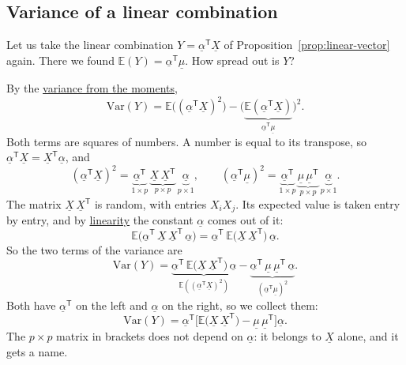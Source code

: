 \documentclass[a4paper,12pt,oneside]{report}
\begin{document}
\subsection{Variance of a linear combination}\label{sec:var-linear}

Let us take the linear combination $Y=\underline{\alpha}^{\mathsf T}\underline{X}$
of Proposition~\ref{prop:linear-vector} again. There we found
$\mathbb{E}(Y)=\underline{\alpha}^{\mathsf T}\underline{\mu}$. How spread out is $Y$?

By the \hyperref[prop:var-moments]{variance from the moments},
\[
\mathrm{Var}(Y)=\mathbb{E}\big((\underline{\alpha}^{\mathsf T}\underline{X})^2\big)
-\big(\underbrace{\mathbb{E}(\underline{\alpha}^{\mathsf T}\underline{X})}_{\underline{\alpha}^{\mathsf T}\underline{\mu}}\big)^2 .
\]
Both terms are squares of numbers. A number is equal to its transpose, so
$\underline{\alpha}^{\mathsf T}\underline{X}=\underline{X}^{\mathsf T}\underline{\alpha}$,
and
\[
(\underline{\alpha}^{\mathsf T}\underline{X})^2
=\underbrace{\underline{\alpha}^{\mathsf T}}_{1\times p}\,
\underbrace{\underline{X}\,\underline{X}^{\mathsf T}}_{p\times p}\,
\underbrace{\underline{\alpha}}_{p\times1},
\qquad
(\underline{\alpha}^{\mathsf T}\underline{\mu})^2
=\underbrace{\underline{\alpha}^{\mathsf T}}_{1\times p}\,
\underbrace{\underline{\mu}\,\underline{\mu}^{\mathsf T}}_{p\times p}\,
\underbrace{\underline{\alpha}}_{p\times1}.
\]
The matrix $\underline{X}\,\underline{X}^{\mathsf T}$ is random, with entries
$X_iX_j$. Its expected value is taken entry by entry, and by
\hyperref[prop:linear-vector]{linearity} the constant $\underline{\alpha}$
comes out of it:
\[
\mathbb{E}\big(\underline{\alpha}^{\mathsf T}\,\underline{X}\,\underline{X}^{\mathsf T}\,\underline{\alpha}\big)
=\underline{\alpha}^{\mathsf T}\,\mathbb{E}\big(\underline{X}\,\underline{X}^{\mathsf T}\big)\,\underline{\alpha}.
\]
So the two terms of the variance are
\[
\mathrm{Var}(Y)=\underbrace{\underline{\alpha}^{\mathsf T}\,\mathbb{E}\big(\underline{X}\,\underline{X}^{\mathsf T}\big)\,\underline{\alpha}}_{\mathbb{E}\left((\underline{\alpha}^{\mathsf T}\underline{X})^2\right)}
-\underbrace{\underline{\alpha}^{\mathsf T}\,\underline{\mu}\,\underline{\mu}^{\mathsf T}\,\underline{\alpha}}_{(\underline{\alpha}^{\mathsf T}\underline{\mu})^2}.
\]
Both have $\underline{\alpha}^{\mathsf T}$ on the left and $\underline{\alpha}$
on the right, so we collect them:
\[
\mathrm{Var}(Y)=\underline{\alpha}^{\mathsf T}\Big[\mathbb{E}\big(\underline{X}\,\underline{X}^{\mathsf T}\big)-\underline{\mu}\,\underline{\mu}^{\mathsf T}\Big]\underline{\alpha}.
\]
The $p\times p$ matrix in brackets does not depend on $\underline{\alpha}$:
it belongs to $\underline{X}$ alone, and it gets a name.
\end{document}

